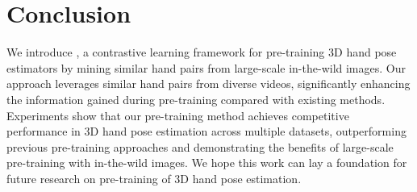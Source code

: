 \section{Conclusion}
We introduce \Ours, a contrastive learning framework for pre-training 3D hand pose estimators by mining similar hand pairs from large-scale in-the-wild images. Our approach leverages similar hand pairs from diverse videos, significantly enhancing the information gained during pre-training compared with existing methods.
Experiments show that our pre-training method achieves competitive performance in 3D hand pose estimation across multiple datasets, outperforming previous pre-training approaches and demonstrating the benefits of large-scale pre-training with in-the-wild images. We hope this work can lay a foundation for future research on pre-training of 3D hand pose estimation.